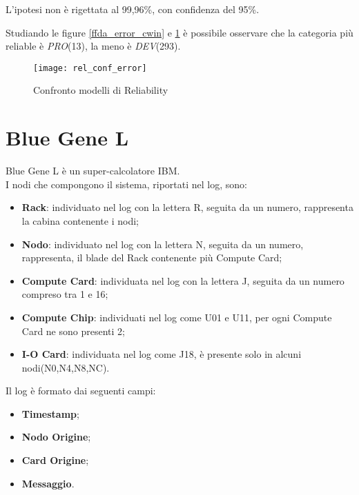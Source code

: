 L'ipotesi non è rigettata al 99,96\%, con confidenza del 95\%.\\

\clearpage

Studiando le figure \ref{ffda_error_cwin} e \ref{ffda_rel_models} è possibile osservare
che la categoria più reliable è \textit{PRO}(13), la meno è \textit{DEV}(293).\\

\begin{figure}[!htbp]
  \centering
  \texttt{[image: rel\_conf\_error]}
  \caption{Confronto modelli di Reliability}
  \label{ffda_rel_models}
\end{figure}

\clearpage

\section{Blue Gene L}
Blue Gene L è un super-calcolatore IBM.\\
I nodi che compongono il sistema, riportati nel log, sono:
\begin{itemize}
  \item \textbf{Rack}: individuato nel log con la lettera R, seguita da un numero,
  rappresenta la cabina contenente i nodi;
  \item \textbf{Nodo}: individuato nel log con la lettera N, seguita da un numero,
  rappresenta, il blade del Rack contenente più Compute Card;
  \item \textbf{Compute Card}: individuata nel log con la lettera J, seguita da un
  numero compreso tra 1 e 16;
  \item \textbf{Compute Chip}: individuati nel log come U01 e U11, per ogni Compute
  Card ne sono presenti 2;
  \item \textbf{I-O Card}: individuata nel log come J18, è presente solo in alcuni
  nodi(N0,N4,N8,NC).
\end{itemize}

Il log è formato dai seguenti campi:
\begin{itemize}
  \item \textbf{Timestamp};
  \item \textbf{Nodo Origine};
  \item \textbf{Card Origine};
  \item \textbf{Messaggio}.
\end{itemize}

\clearpage

